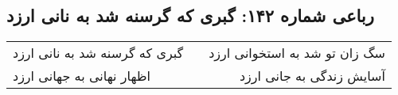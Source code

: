 \begin{center}
\section*{رباعی شماره ۱۴۲: گبری که گرسنه شد به نانی ارزد}
\label{sec:sh142}
\begin{longtable}{l p{0.5cm} r}
گبری که گرسنه شد به نانی ارزد
&&
سگ زان تو شد به استخوانی ارزد
\\
اظهار نهانی به جهانی ارزد
&&
آسایش زندگی به جانی ارزد
\\
\end{longtable}
\end{center}
